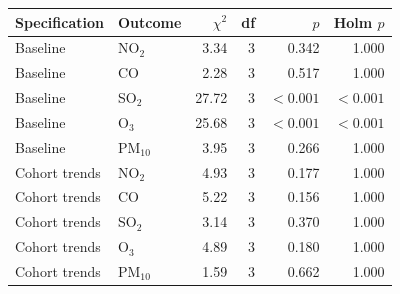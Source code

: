 \begin{tabular}{llrrrr}
\toprule
Specification & Outcome & $\chi^2$ & df & $p$ & Holm $p$ \\
\midrule
Baseline & NO$_2$ & 3.34 & 3 & 0.342 & 1.000 \\
Baseline & CO & 2.28 & 3 & 0.517 & 1.000 \\
Baseline & SO$_2$ & 27.72 & 3 & $<0.001$ & $<0.001$ \\
Baseline & O$_3$ & 25.68 & 3 & $<0.001$ & $<0.001$ \\
Baseline & PM$_{10}$ & 3.95 & 3 & 0.266 & 1.000 \\
\midrule
Cohort trends & NO$_2$ & 4.93 & 3 & 0.177 & 1.000 \\
Cohort trends & CO & 5.22 & 3 & 0.156 & 1.000 \\
Cohort trends & SO$_2$ & 3.14 & 3 & 0.370 & 1.000 \\
Cohort trends & O$_3$ & 4.89 & 3 & 0.180 & 1.000 \\
Cohort trends & PM$_{10}$ & 1.59 & 3 & 0.662 & 1.000 \\
\bottomrule
\end{tabular}
